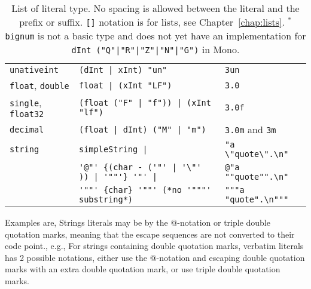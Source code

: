 \begin{table}
\begin{tabular}{|l|l|l|}
    \lstinline!unativeint! & \lstinline[language=ebnf]!(dInt | xInt) "un"!  & \lstinline!3un!  \\
    \lstinline!float!, \lstinline!double! & \lstinline[language=ebnf]!float | (xInt "LF")!  & \lstinline!3.0!  \\
    \lstinline!single!, \lstinline!float32! & \lstinline[language=ebnf]!(float ("F" | "f")) | (xInt "lf") !  & \lstinline!3.0f!  \\
    \lstinline!decimal! &\lstinline[language=ebnf]!(float | dInt) ("M" | "m")! & \lstinline!3.0m! and \lstinline!3m!  \\
    \lstinline!string! & \lstinline[language=ebnf]!simpleString |! & \lstinline!"a \"quote\".\n"!  \\
         & \lstinline[language=ebnf]!'@"' {(char - ('"' | '\"' )) | '""'} '"' |!&\lstinline!@"a ""quote"".\n"! \\
         & \lstinline[language=ebnf]!'""' {char} '""' (*no '"""' substring*)! & \lstinline!"""a "quote".\n"""!  \\
    \hline
  \end{tabular}
  \caption{List of literal type. No spacing is allowed between the literal and the prefix or suffix. \lstinline![]! notation is for lists, see Chapter~\ref{chap:lists}. $^*$\lstinline[language=ebnf]!bignum! is not a basic type and does not yet have an implementation for \lstinline[language=ebnf]!dInt ("Q"|"R"|"Z"|"N"|"G")! in Mono.}
  \label{tab:literalTypes}
\end{table}
Examples are,
%
Strings literals may be  by the @-notation or triple double quotation marks, meaning that the escape sequences are not converted to their code point., e.g., 
%
%
For strings containing double quotation marks, verbatim literals has 2 possible notations, either use the @-notation and escaping double quotation marks with an extra double quotation mark, or use triple double quotation marks. 

